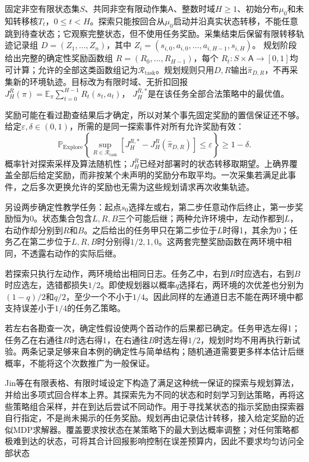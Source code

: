 固定非空有限状态集$S$、共同非空有限动作集$\mathsf A$、整数时域$H\geq1$、初始分布$\mu_0$和未知转移核$T_t$，$0\leq t<H$。探索只能按回合从$\mu_0$启动并沿真实状态转移，不能任意跳到待查状态；它观察完整状态，但不使用任务奖励。采集结束后保留有限转移轨迹记录组
$D=(Z_1,\ldots,Z_n)$，其中
$Z_i=(s_{i,0},a_{i,0},\ldots,a_{i,H-1},s_{i,H})$。
规划阶段给出完整的确定性奖励函数组
$R=(R_0,\ldots,R_{H-1})$，每个
$R_t:S\times\mathsf A\to[0,1]$均可计算；允许的全部这类函数组记为$\mathcal R_{\mathrm{task}}$。规划规则只用$D,R$输出$\widehat\pi_{D,R}$，不再采集新的环境轨迹。目标改为有限时域、无折扣回报
$J_H^R(\pi)=\mathbb E_\pi\sum_{t=0}^{H-1}R_t(s_t,a_t)$，
$J_H^{R,*}$是在该任务全部合法策略中的最优值。

奖励可能在看过勘查结果后才确定，所以对某个事先固定奖励的置信保证还不够。给定$\varepsilon,\delta\in(0,1)$，所需的是同一探索事件对所有允许奖励有效：
\begin{equation}
 \mathbb P_{\mathrm{Explore}}\!\left\{
  \sup_{R\in\mathcal R_{\mathrm{task}}}
     [J_H^{R,*}-J_H^R(\widehat\pi_{D,R})]
       \leq\varepsilon\right\}\geq1-\delta.
 \label{eq:rl-learning-reward-free-goal}
\end{equation}
概率针对探索采样及算法随机性；$J_H^R$已经对部署时的状态转移取期望。上确界覆盖全部后给定奖励，而非按某个未声明的奖励分布取平均。一次采集若满足此事件，之后多次更换允许的奖励也无需为这些规划请求再次收集轨迹。

\begin{example}[两条通道与后给定奖励]
 \label{ex:rl-learning-reward-free-branches}
 另设两步确定性教学任务：起点$s_0$选择左或右，第二步任意动作后终止，第一步奖励恒为0。状态集合包含$L,R,B$三个可能后继；两种允许环境中，左动作都到$L$，右动作却分别到$R$和$B$。之后给出的任务甲只在第二步位于$L$时得1，其余为0；任务乙在第二步位于$L,R,B$时分别得$1/2,1,0$。这两套完整奖励函数在两环境中相同，不透露右动作的实际后继。

 若探索只执行左动作，两环境给出相同日志。任务乙中，右到$R$时应选右，右到$B$时应选左，选错都损失$1/2$。即使规划器以概率$q$选择右，两环境的次优差也分别为$(1-q)/2$和$q/2$，至少一个不小于$1/4$。因此同样的左通道日志不能在两环境中都支持误差小于$1/4$的任务乙策略。

 若左右各勘查一次，确定性假设使两个首动作的后果都已确定。任务甲选左得1；任务乙在右通往$R$时选右得1，在右通往$B$时选左得$1/2$，规划时均不用再执行新试验。两条记录足够来自本例的确定性与简单结构；随机通道需要更多样本估计后继概率，不能将这个次数推广为一般保证。
\end{example}

Jin等在有限表格、有限时域设定下构造了满足这种统一保证的探索与规划算法，并给出多项式回合样本上界。其探索先为不同的状态和时刻学习到达策略，再将这些策略组合采样，并在到达后尝试不同动作。用于寻找某状态的指示奖励由探索器自行指定，不是尚未揭示的任务奖励。规划再由记录估计转移，接入给定奖励的近似MDP求解器。覆盖要求按状态在某策略下的最大到达概率调整；对任何策略都极难到达的状态，可将其合计回报影响控制在误差预算内，因此不要求均匀访问全部状态

